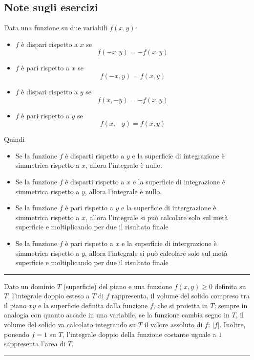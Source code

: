 \subsection*{Note sugli esercizi}
Data una funzione su due variabili $f(x,y)$:
\begin{itemize}
    \item $f$ è dispari rispetto a $x$ se 
    \[
        f(-x,y) = -f(x,y)
    \]
    \item $f$ è pari rispetto a $x$ se 
    \[
        f(-x,y) = f(x,y)
    \]
    \item $f$ è dispari rispetto a $y$ se 
    \[
        f(x,-y) = -f(x,y)
    \]
    \item $f$ è pari rispetto a $y$ se 
    \[
        f(x,-y) = f(x,y)
    \]
\end{itemize}
Quindi
\begin{itemize}
    \item Se la funzione $f$ è disparti rispetto a $y$ e la superficie di integrazione è simmetrica rispetto a $x$, allora l'integrale è nullo.\newline
    \item Se la funzione $f$ è disparti rispetto a $x$ e la superficie di integrazione è simmetrica rispetto a $y$, allora l'integrale è nullo.
    \item Se la funzione $f$ è pari rispetto a $y$ e la superficie di intergrazione è simmetrica rispetto a $x$, allora l'integrale si può calcolare solo sul metà superficie e moltiplicando per due il risultato finale    \item Se la funzione $f$ è pari rispetto a $x$ e la superficie di intergrazione è simmetrica rispetto a $y$, allora l'integrale si può calcolare solo sul metà superficie e moltiplicando per due il risultato finale
\end{itemize}
\rule{\textwidth}{0,4pt}\newline
Dato un dominio $T$ (superficie) del piano e una funzione $f(x,y) \geq 0$ definita su $T$, l'integrale doppio esteso a $T$ di $f$ rappresenta, il volume del solido compreso tra il piano $xy$ e la superficie definita dalla funzione $f$, che si proietta in $T$; sempre in analogia con quanto accade in una variabile, se la funzione cambia segno in $T$, il volume del solido va calcolato integrando su $T$ il valore assoluto di $f$: $|f|$. Inoltre, ponendo $f = 1$ su $T$, l'integrale doppio della funzione costante uguale a $1$ sappresenta l'area di $T$.\newline
\rule{\textwidth}{0,4pt}\newline
